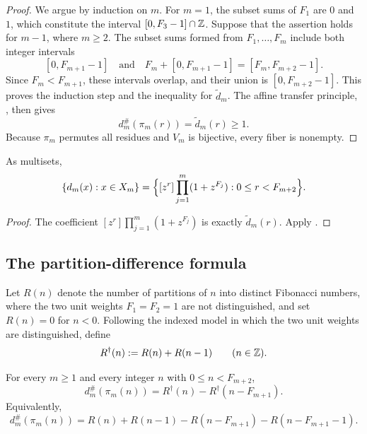\begin{proof}
We argue by induction on \(m\).  For \(m=1\), the subset sums of \(F_1\) are
\(0\) and \(1\), which constitute the interval
\([0,F_3-1]\cap\mathbb{Z}\).  Suppose that the assertion holds for \(m-1\), where
\(m\ge2\).  The subset sums formed from \(F_1,\ldots,F_m\) include both
integer intervals
\[
  [0,F_{m+1}-1]
  \quad\text{and}\quad
  F_m+[0,F_{m+1}-1]=[F_m,F_{m+2}-1].
\]
Since \(F_m<F_{m+1}\), these intervals overlap, and their union is
\([0,F_{m+2}-1]\).  This proves the induction step and the inequality for
\(\widetilde d_m\).  The affine transfer principle, ,
then gives
\[
  d_m^\#(\pi_m(r))=\widetilde d_m(r)\ge1.
\]
Because \(\pi_m\) permutes all residues and \(V_m\) is bijective, every fiber
is nonempty.
\end{proof}

\begin{corollary}
\label{cor:coefficient-spectrum}
As multisets,
\[
  \{d_m(x):x\in X_m\}
  =
  \Bigl\{
    [z^r]\prod_{j=1}^m(1+z^{F_j}) : 0\le r<F_{m+2}
  \Bigr\}.
\]
\end{corollary}

\begin{proof}
The coefficient \([z^r]\prod_{j=1}^m(1+z^{F_j})\) is exactly
\(\widetilde d_m(r)\).  Apply .
\end{proof}

\subsection{The partition-difference formula}

\begin{definition}
\label{def:partition-functions}
Let \(R(n)\) denote the number of partitions of \(n\) into distinct Fibonacci
numbers, where the two unit weights \(F_1=F_2=1\) are not distinguished, and
set \(R(n)=0\) for \(n<0\).  Following the indexed model in which the two unit
weights are distinguished, define
\[
  R^\dagger(n):=R(n)+R(n-1)
  \qquad (n\in\mathbb{Z}).
\]
\end{definition}

\begin{theorem}
\label{thm:partition-difference}
For every \(m\ge1\) and every integer \(n\) with
\(0\le n<F_{m+2}\),
\[
  d_m^\#(\pi_m(n))
  =
  R^\dagger(n)-R^\dagger(n-F_{m+1}).
\]
Equivalently,
\[
  d_m^\#(\pi_m(n))
  =
  R(n)+R(n-1)-R(n-F_{m+1})-R(n-F_{m+1}-1).
\]
\end{theorem}

